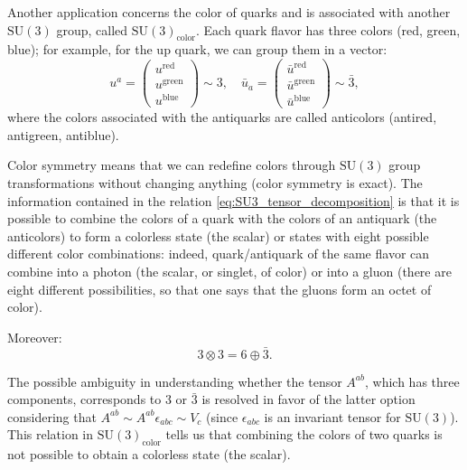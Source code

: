 \begin{example}
    Another application concerns the color of quarks and is associated with another \(\mathrm{SU}(3)\) group, called \(\mathrm{SU}(3)_{\text{color}}\). Each quark flavor has three colors (red, green, blue); for example, for the up quark, we can group them in a vector:
    \[
        u^a = \begin{pmatrix} u^{\text{red}} \\ u^{\text{green}} \\ u^{\text{blue}} \end{pmatrix} \sim 3, \quad \bar{u}_a = \begin{pmatrix} \bar{u}^{\text{red}} \\ \bar{u}^{\text{green}} \\ \bar{u}^{\text{blue}} \end{pmatrix} \sim \bar{3},
    \]
    where the colors associated with the antiquarks are called anticolors (antired, antigreen, antiblue).

    Color symmetry means that we can redefine colors through \(\mathrm{SU}(3)\) group transformations without changing anything (color symmetry is exact). The information contained in the relation \eqref{eq:SU3_tensor_decomposition} is that it is possible to combine the colors of a quark with the colors of an antiquark (the anticolors) to form a colorless state (the scalar) or states with eight possible different color combinations: indeed, quark/antiquark of the same flavor can combine into a photon (the scalar, or singlet, of color) or into a gluon (there are eight different possibilities, so that one says that the gluons form an octet of color).

    Moreover:
    \[
        3 \otimes 3 = 6 \oplus \bar{3}.
    \]

    The possible ambiguity in understanding whether the tensor \(A^{ab}\), which has three components, corresponds to 3 or \(\bar{3}\) is resolved in favor of the latter option considering that \(A^{ab} \sim A^{ab} \epsilon_{abc} \sim V_c\) (since \(\epsilon_{abc}\) is an invariant tensor for \(\mathrm{SU}(3)\)). This relation in \(\mathrm{SU}(3)_{\text{color}}\) tells us that combining the colors of two quarks is not possible to obtain a colorless state (the scalar).


\end{example}
